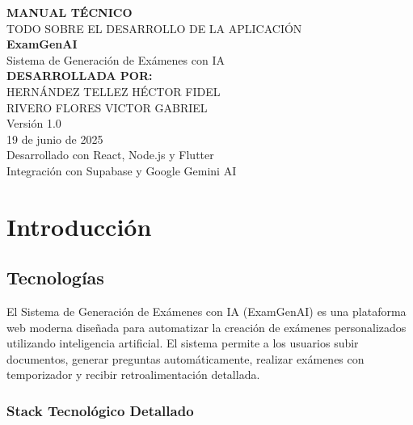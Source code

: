 \documentclass[12pt,a4paper]{report}
\begin{document}
\begin{titlepage}
    \centering
    \vspace*{2cm}
    
    {\Huge\bfseries MANUAL TÉCNICO}\\[0.5cm]
    {\Large TODO SOBRE EL DESARROLLO DE LA APLICACIÓN}\\[2cm]
    
    {\Huge\bfseries ExamGenAI}\\[0.5cm]
    {\Large Sistema de Generación de Exámenes con IA}\\[3cm]
    
    {\large\bfseries DESARROLLADA POR:}\\[0.5cm]
    {\large HERNÁNDEZ TELLEZ HÉCTOR FIDEL}\\
    {\large RIVERO FLORES VICTOR GABRIEL  }\\
    
    {\large Versión 1.0}\\[0.5cm]
    {\large 19 de junio de 2025}\\[2cm]
    
    {\large Desarrollado con React, Node.js y Flutter}\\
    {\large Integración con Supabase y Google Gemini AI}
    
    \vfill
\end{titlepage}

\tableofcontents
\newpage

\chapter{Introducción}

\section{Tecnologías}

El Sistema de Generación de Exámenes con IA (ExamGenAI) es una plataforma web moderna diseñada para automatizar la creación de exámenes personalizados utilizando inteligencia artificial. El sistema permite a los usuarios subir documentos, generar preguntas automáticamente, realizar exámenes con temporizador y recibir retroalimentación detallada.

\subsection{Stack Tecnológico Detallado}
\end{document}
